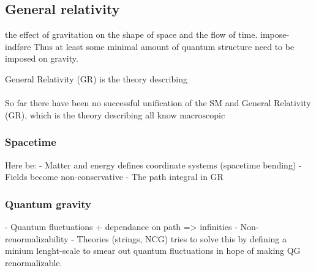 \subsection{General relativity}
the effect of gravitation on the shape of space and the flow of time.
impose-indføre
Thus at least some minimal amount of quantum structure need to be imposed 
on gravity. 

General Relativity (GR) is the theory describing
\\ \\
So far there have been no successful unification of the SM and General Relativity (GR), which is the theory describing all know macroscopic

\subsubsection{Spacetime}
Here be:
- Matter and energy defines coordinate systems (spacetime bending)
- Fields become non-conservative
- The path integral in GR

\subsubsection{Quantum gravity}
- Quantum fluctuations + dependance on path => infinities
- Non-renormalizability
- Theories (strings, NCG) tries to solve this by defining a minium lenght-scale
  to smear out quantum fluctuations in hope of making QG renormalizable.